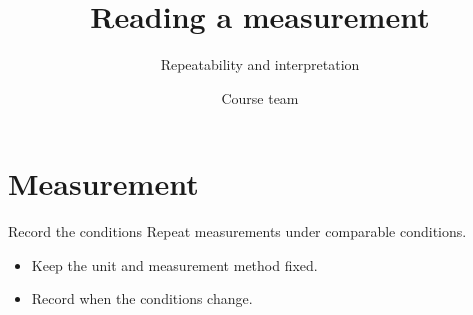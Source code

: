 \documentclass[aspectratio=169,t]{beamer}
\title{Reading a measurement}
\subtitle{Repeatability and interpretation}
\author{Course team}
\institute{Teaching seminar}
\date{}
\begin{document}
\maketitle
\section{Measurement}
\begin{frame}{Record the conditions}
Repeat measurements under comparable conditions.
\CoreParagraphToList
\begin{itemize}
  \item Keep the unit and measurement method fixed.
  \item Record when the conditions change.
\end{itemize}
\end{frame}
\end{document}
